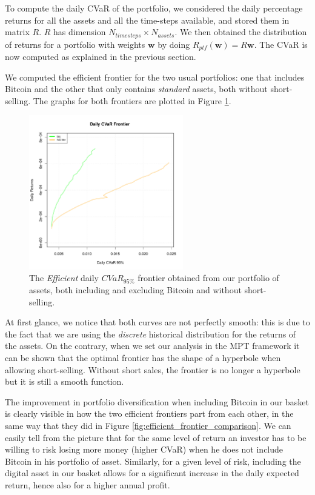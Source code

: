 To compute the daily CVaR of the portfolio, we considered the daily percentage returns for all the assets and all the time-steps available, and stored them in matrix $R$. $R$ has dimension $N_{timesteps} \times N_{assets}$. We then obtained the distribution of returns for a portfolio with weights $\mathbf{w}$ by doing $R_{ptf}(\mathbf{w}) = R \mathbf{w} $. The CVaR is now computed as explained in the previous section.

We computed the efficient frontier for the two usual portfolios: one that includes Bitcoin and the other that only contains \textit{standard} assets, both without short-selling. The graphs for both frontiers are plotted in Figure \ref{fig:cvar_efficient_frontier_comparison}.


\begin{figure}
	\centering
	\includegraphics[width=0.6\textwidth]{Images/efficient_frontier_CVaR.pdf}
	\caption[Efficient CVaR frontier comparison]{The \textit{Efficient} daily $CVaR_{95\%}$ frontier obtained from our portfolio of assets, both including and excluding Bitcoin and without short-selling.}
	\label{fig:cvar_efficient_frontier_comparison}
\end{figure}


At first glance, we notice that both curves are not perfectly smooth: this is due to the fact that we are using the \textit{discrete} historical distribution for the returns of the assets. On the contrary, when we set our analysis in the MPT framework it can be shown that the optimal frontier has the shape of a hyperbole when allowing short-selling. Without short sales, the frontier is no longer a hyperbole but it is still a smooth function.

The improvement in portfolio diversification when including Bitcoin in our basket is clearly visible in how the two efficient frontiers part from each other, in the same way that they did in Figure \ref{fig:efficient_frontier_comparison}.
We can easily tell from the picture that for the same level of return an investor has to be willing to risk losing more money (higher CVaR) when he does not include Bitcoin in his portfolio of asset.
Similarly, for a given level of risk, including the digital asset in our basket allows for a significant increase in the daily expected return,  hence also for a higher annual profit.

